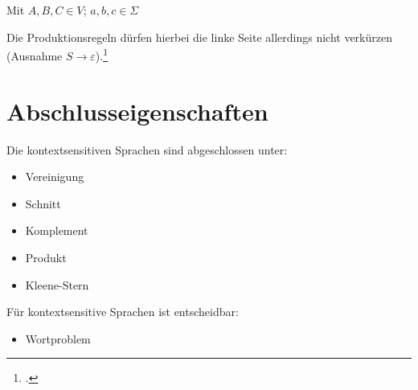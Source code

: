 \documentclass{bschlangaul-theorie}
\begin{document}
Mit $A,B,C \in V$; $a,b,c \in \Sigma$



Die Produktionsregeln dürfen hierbei die linke Seite allerdings nicht
verkürzen (Ausnahme $S \rightarrow \varepsilon$).\footcite{theo:fs:3}

%

\section{Abschlusseigenschaften}

Die kontextsensitiven Sprachen sind abgeschlossen unter:

\begin{itemize}
\item Vereinigung
\item Schnitt
\item Komplement
\item Produkt
\item Kleene-Stern
\end{itemize}

Für kontextsensitive Sprachen ist entscheidbar:

\begin{itemize}
\item Wortproblem
\end{itemize}

\literatur
\end{document}
